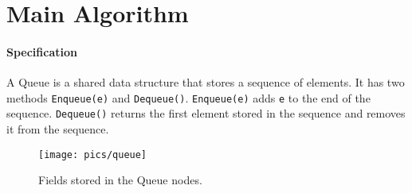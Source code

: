 \documentclass[10pt]{article}
\theoremstyle{definition}
\begin{document}
\section{Main Algorithm}

\paragraph{Specification}
A Queue is a shared data structure that stores a sequence of elements. It has two methods \texttt{Enqueue(e)} and \texttt{Dequeue()}. \texttt{Enqueue(e)} adds \texttt{e} to the end of the sequence. \texttt{Dequeue()} returns the first element stored in the sequence and removes it from the sequence.



\begin{figure}[hbt]
\centering
  \texttt{[image: pics/queue]}
  \caption{Fields stored in the Queue nodes. \label{fig::queue}}
\end{figure}
\end{document}
